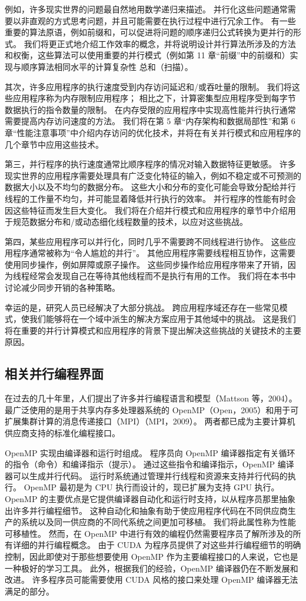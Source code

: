 例如，许多现实世界的问题最自然地用数学递归来描述。 并行化这些问题通常需要以非直观的方式思考问题，并且可能需要在执行过程中进行冗余工作。 有一些重要的算法原语，例如前缀和，可以促进将问题的顺序递归公式转换为更并行的形式。 我们将更正式地介绍工作效率的概念，并将说明设计并行算法所涉及的方法和权衡，这些算法可以使用重要的并行模式（例如第 11 章“前缀”中的前缀和）实现与顺序算法相同水平的计算复杂性 总和（扫描）。

其次，许多应用程序的执行速度受到内存访问延迟和/或吞吐量的限制。 我们将这些应用程序称为内存限制应用程序； 相比之下，计算密集型应用程序受到每字节数据执行的指令数量的限制。 在内存受限的应用程序中实现高性能并行执行通常需要提高内存访问速度的方法。 我们将在第 5 章“内存架构和数据局部性”和第 6 章“性能注意事项”中介绍内存访问的优化技术，并将在有关并行模式和应用程序的几个章节中应用这些技术。

第三，并行程序的执行速度通常比顺序程序的情况对输入数据特征更敏感。 许多现实世界的应用程序需要处理具有广泛变化特征的输入，例如不稳定或不可预测的数据大小以及不均匀的数据分布。 这些大小和分布的变化可能会导致分配给并行线程的工作量不均匀，并可能显着降低并行执行的效率。 并行程序的性能有时会因这些特征而发生巨大变化。 我们将在介绍并行模式和应用程序的章节中介绍用于规范数据分布和/或动态细化线程数量的技术，以应对这些挑战。

第四，某些应用程序可以并行化，同时几乎不需要跨不同线程进行协作。 这些应用程序通常被称为“令人尴尬的并行”。 其他应用程序需要线程相互协作，这需要使用同步操作，例如屏障或原子操作。 这些同步操作给应用程序带来了开销，因为线程经常会发现自己在等待其他线程而不是执行有用的工作。 我们将在本书中讨论减少同步开销的各种策略。

幸运的是，研究人员已经解决了大部分挑战。 跨应用程序域还存在一些常见模式，使我们能够将在一个域中派生的解决方案应用于其他域中的挑战。 这是我们将在重要的并行计算模式和应用程序的背景下提出解决这些挑战的关键技术的主要原因。

\subsection{相关并行编程界面}
在过去的几十年里，人们提出了许多并行编程语言和模型（Mattson 等，2004）。 最广泛使用的是用于共享内存多处理器系统的 OpenMP（Open，2005）和用于可扩展集群计算的消息传递接口（MPI）（MPI，2009）。 两者都已成为主要计算机供应商支持的标准化编程接口。

OpenMP 实现由编译器和运行时组成。 程序员向 OpenMP 编译器指定有关循环的指令（命令）和编译指示（提示）。 通过这些指令和编译指示，OpenMP 编译器可以生成并行代码。 运行时系统通过管理并行线程和资源来支持并行代码的执行。 OpenMP 最初是为 CPU 执行而设计的，现已扩展为支持 GPU 执行。 OpenMP 的主要优点是它提供编译器自动化和运行时支持，以从程序员那里抽象出许多并行编程细节。 这种自动化和抽象有助于使应用程序代码在不同供应商生产的系统以及同一供应商的不同代系统之间更加可移植。 我们将此属性称为性能可移植性。 然而，在 OpenMP 中进行有效的编程仍然需要程序员了解所涉及的所有详细的并行编程概念。 由于 CUDA 为程序员提供了对这些并行编程细节的明确控制，因此即使对于那些想要使用 OpenMP 作为主要编程接口的人来说，它也是一种极好的学习工具。 此外，根据我们的经验，OpenMP 编译器仍在不断发展和改进。 许多程序员可能需要使用 CUDA 风格的接口来处理 OpenMP 编译器无法满足的部分。

